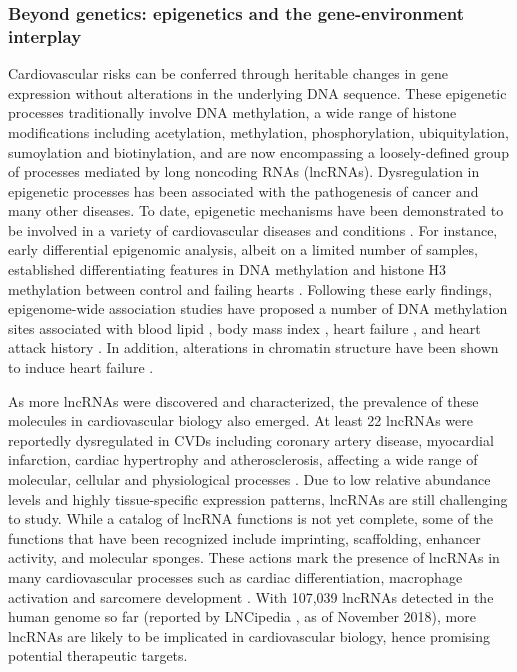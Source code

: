 \documentclass[letter]{bioinfo}
\begin{document}
\subsubsection*{Beyond genetics: epigenetics and the gene-environment interplay}	
	Cardiovascular risks can be conferred through heritable changes in gene expression without alterations in the underlying DNA sequence.  These epigenetic processes traditionally involve DNA methylation, a wide range of histone modifications including acetylation, methylation, phosphorylation, ubiquitylation, sumoylation and biotinylation, and are now encompassing a loosely-defined group of processes mediated by long noncoding RNAs (lncRNAs). Dysregulation in epigenetic processes has been associated with the pathogenesis of cancer and many other diseases. To date, epigenetic mechanisms have been demonstrated to be involved in a variety of cardiovascular diseases and conditions \citep{Udali:2013:Cardiovascular,AbiKhalil:2014:emerging,Muka:2016:role,Gidlof:2016:Ischemic}.
	For instance, early differential epigenomic analysis, albeit on a limited number of samples, established differentiating features in DNA methylation and histone H3 methylation between control and failing hearts \citep{Movassagh:2011:Distinct}. Following these early findings, epigenome-wide association studies have proposed a number of DNA methylation sites associated with blood lipid \citep{Irvin:2014:Epigenomewide}, body mass index \citep{Dick:2014:DNA, Wahl:2017:Epigenomewide}, heart failure \citep{Meder:2017:EpigenomeWide}, and heart attack history \citep{Rask-Andersen:2016:Epigenomewide}. In addition, alterations in chromatin structure have been shown to induce heart failure \citep{Rosa-Garrido:2017:HighResolution}.  
	
	As more lncRNAs were discovered and characterized, the prevalence of these molecules in cardiovascular biology also emerged.
	At least 22 lncRNAs were reportedly dysregulated in CVDs including coronary artery disease, myocardial infarction, cardiac hypertrophy and atherosclerosis, affecting a wide range of molecular, cellular and physiological processes \citep{Das:2018:Deciphering, Xu:2018:Targeting}. Due to low relative abundance levels and highly tissue-specific expression patterns, lncRNAs are still challenging to study.
	While a catalog of lncRNA functions is not yet complete, some of the functions that have been recognized include imprinting, scaffolding, enhancer activity, and molecular sponges. These actions mark the presence of lncRNAs in many cardiovascular processes such as cardiac differentiation, macrophage activation and sarcomere development \citep{Sallam:2018:Long}.
	With 107,039 lncRNAs detected in the human genome so far (reported by LNCipedia \citep{Volders:2018:LNCipedia}, as of November 2018), more lncRNAs are likely to be implicated in cardiovascular biology, hence promising potential therapeutic targets.
\end{document}
